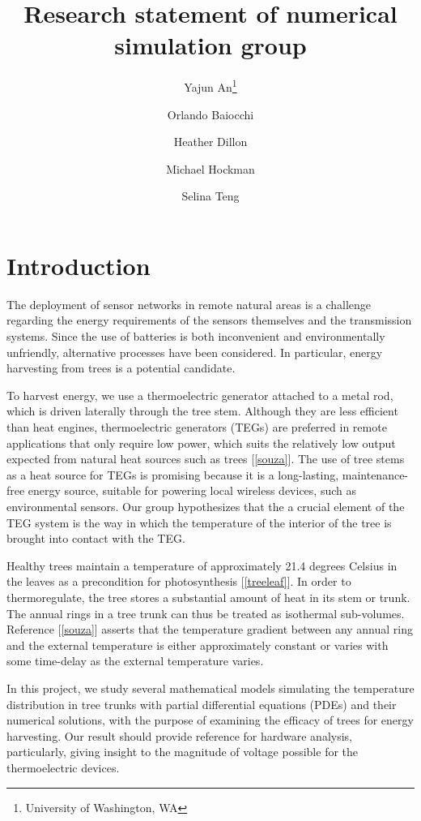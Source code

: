 \documentclass[12pt]{article}
\title{Research statement of numerical simulation group}
\author{Yajun An\thanks{University of Washington, WA} %
\and Orlando Baiocchi \footnotemark[1]
\and Heather Dillon\footnotemark[1]
\and Michael Hockman\footnotemark[1]
\and Selina Teng\footnotemark[1]}
\begin{document}
\maketitle





\section*{Introduction}  
The deployment of sensor networks in remote natural areas is a challenge regarding the energy requirements of the sensors themselves and the transmission systems. Since the use of batteries is both inconvenient and environmentally unfriendly, alternative processes have been considered. In particular, energy harvesting from trees is a potential candidate.

To harvest energy, we use a thermoelectric generator attached to a metal rod, which is driven laterally through the tree stem. Although they are less efficient than heat engines, thermoelectric generators (TEGs) are preferred in remote applications that only require low power, which suits the relatively low output expected from natural heat sources such as trees [\ref{souza}]. The use of tree stems as a heat source for TEGs is promising because it is a long-lasting, maintenance-free energy source, suitable for powering local wireless devices, such as environmental sensors. Our group hypothesizes that the a crucial element of the TEG system is the way in which the temperature of the interior of the tree is brought into contact with the TEG.

Healthy trees maintain a temperature of approximately 21.4 degrees Celsius in the leaves as a precondition for photosynthesis [\ref{treeleaf}]. In order to thermoregulate, the tree stores a substantial amount of heat in its stem or trunk. The annual rings in a tree trunk can thus be treated as isothermal sub-volumes. Reference [\ref{souza}] asserts that the temperature gradient between any annual ring and the external temperature is either approximately constant or varies with some time-delay as the external temperature varies. 

In this project, we study several mathematical models simulating the temperature distribution in tree trunks with partial differential equations (PDEs) and their numerical solutions, with the purpose of examining the efficacy of trees for energy harvesting. Our result should provide reference for hardware analysis, particularly, giving insight to the magnitude of voltage possible for the thermoelectric devices.
\end{document}
